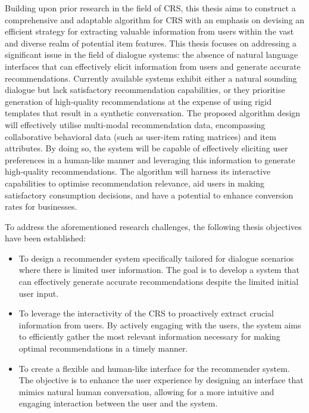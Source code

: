 Building upon prior research in the field of CRS, this thesis aims to construct a comprehensive and adaptable algorithm for CRS with an emphasis on devising an efficient strategy for extracting valuable information from users within the vast and diverse realm of potential item features. This thesis focuses on addressing a significant issue in the field of dialogue systems: the absence of natural language interfaces that can effectively elicit information from users and generate accurate recommendations. Currently available systems exhibit either a natural sounding dialogue but lack satisfactory recommendation capabilities, or they prioritise generation of high-quality recommendations at the expense of using rigid templates that result in a synthetic conversation. The proposed algorithm design will effectively utilise multi-modal recommendation data, encompassing collaborative behavioral data (such as user-item rating matrices) and item attributes. By doing so, the system will be capable of effectively eliciting user preferences in a human-like manner and leveraging this information to generate high-quality recommendations. The algorithm will harness its interactive capabilities to optimise recommendation relevance, aid users in making satisfactory consumption decisions, and have a potential to enhance conversion rates for businesses. 

To address the aforementioned research challenges, the following thesis objectives have been established:

\begin{itemize}
    \item  To design a recommender system specifically tailored for dialogue scenarios where there is limited user information. The goal is to develop a system that can effectively generate accurate recommendations despite the limited initial user input.
    \item  To leverage the interactivity of the CRS to proactively extract crucial information from users. By actively engaging with the users, the system aims to efficiently gather the most relevant information necessary for making optimal recommendations in a timely manner.
    \item  To create a flexible and human-like interface for the recommender system. The objective is to enhance the user experience by designing an interface that mimics natural human conversation, allowing for a more intuitive and engaging interaction between the user and the system.
\end{itemize}

